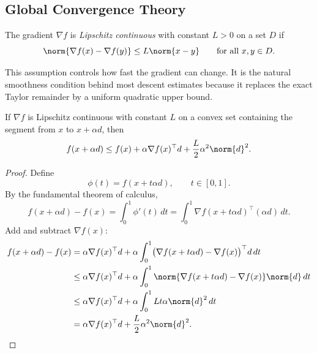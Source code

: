 \subsection{Global Convergence Theory}
\label{sec:l2-global-convergence-theory}

\begin{definition}\label{def:l2-lipschitz-continuous-gradient}
	The gradient $\nabla f$ is \emph{Lipschitz continuous} with constant $L>0$ on a set $D$ if
	\[
		\norm{\nabla f(x)-\nabla f(y)} \le L \norm{x-y}
		\qquad \text{for all } x,y \in D.
	\]
\end{definition}

\begin{remark}
	This assumption controls how fast the gradient can change. It is the natural smoothness condition behind most descent estimates because it replaces the exact Taylor remainder by a uniform quadratic upper bound.
\end{remark}

\begin{theorem}\label{thm:l2-descent-lemma-quadratic-upper-bound}
	If $\nabla f$ is Lipschitz continuous with constant $L$ on a convex set containing the segment from $x$ to $x+\alpha d$, then
	\[
		f(x+\alpha d)
		\le
		f(x)+\alpha \nabla f(x)^\top d + \frac{L}{2}\alpha^2 \norm{d}^2.
	\]
\end{theorem}
\begin{proof}
	Define
	\[
		\phi(t)=f(x+t\alpha d), \qquad t \in [0,1].
	\]
	By the fundamental theorem of calculus,
	\[
		f(x+\alpha d)-f(x)
		=
		\int_0^1 \phi'(t)\,dt
		=
		\int_0^1 \nabla f(x+t\alpha d)^\top (\alpha d)\,dt.
	\]
	Add and subtract $\nabla f(x)$:
	\begin{align*}
		f(x+\alpha d)-f(x)
		 & = \alpha \nabla f(x)^\top d
		+ \alpha \int_0^1 \bigl(\nabla f(x+t\alpha d)-\nabla f(x)\bigr)^\top d\,dt \\
		 & \le \alpha \nabla f(x)^\top d
		+ \alpha \int_0^1 \norm{\nabla f(x+t\alpha d)-\nabla f(x)} \norm{d}\,dt \\
		 & \le \alpha \nabla f(x)^\top d
		+ \alpha \int_0^1 Lt\alpha \norm{d}^2\,dt \\
		 & = \alpha \nabla f(x)^\top d + \frac{L}{2}\alpha^2 \norm{d}^2.
	\end{align*}
\end{proof}

